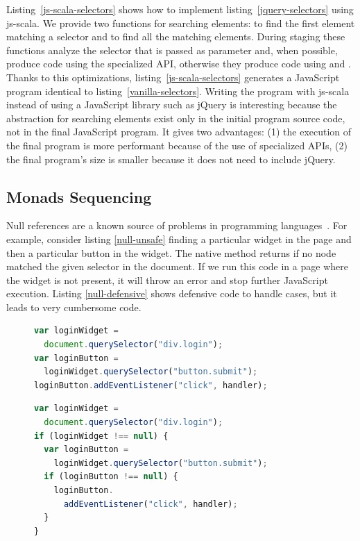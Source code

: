 \documentclass[preprint]{sigplanconf}
\begin{document}
Listing~\ref{js-scala-selectors} shows how to implement listing~\ref{jquery-selectors} using js-scala. We provide two
functions for searching elements:  to find the first element matching a selector and  to
find all the matching elements. During staging these functions analyze the selector that is passed as parameter and,
when possible, produce code using the specialized API, otherwise they produce code using  and
. Thanks to this optimizations, listing~\ref{js-scala-selectors} generates a JavaScript
program identical to listing~\ref{vanilla-selectors}. Writing the program with js-scala instead of using a JavaScript
library such as jQuery is interesting because the abstraction for searching elements exist only in the initial
program source code, not in the final JavaScript program. It gives two advantages: (1) the execution of the final
program is more performant because of the use of specialized APIs, (2) the final program’s size is smaller because it
does not need to include jQuery.

\subsection{Monads Sequencing}

Null references are a known source of problems in programming languages~\cite{Hoare09_Null,Nanda09_Null}. For
example, consider listing \ref{null-unsafe} finding a particular widget in the page and then a particular
button in the widget. The native  method returns  if no node matched the given
selector in the document. If we run this code in a page where the widget is not present, it will throw an error
and stop further JavaScript execution. Listing \ref{null-defensive} shows defensive code to handle 
cases, but it leads to very cumbersome code.


\begin{figure}
\begin{lstlisting}[language=JavaScript,label=null-unsafe,caption=Unsafe code]
var loginWidget =
  document.querySelector("div.login");
var loginButton =
  loginWidget.querySelector("button.submit");
loginButton.addEventListener("click", handler);
\end{lstlisting}
\end{figure}


\begin{figure}
\begin{lstlisting}[language=JavaScript,label=null-defensive,caption=Defensive programming to handle null references]
var loginWidget =
  document.querySelector("div.login");
if (loginWidget !== null) {
  var loginButton =
    loginWidget.querySelector("button.submit");
  if (loginButton !== null) {
    loginButton.
      addEventListener("click", handler);
  }
}
\end{lstlisting}
\end{figure}
\end{document}
